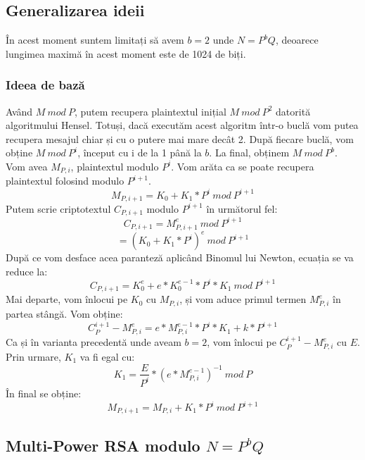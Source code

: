\documentclass[12]{report}
\begin{document}
		  \subsection{Generalizarea ideii}
		  În acest moment suntem limitați să avem $b=2$ unde $N=P^bQ$, deoarece lungimea maximă în acest moment este de 1024 de biți.
		  \subsubsection{Ideea de bază}
		  Având $M \ mod \ P$, putem recupera plaintextul inițial $ M \ mod \ P^2$ datorită algoritmului Hensel. Totuși, dacă executăm acest algoritm într-o buclă vom putea recupera mesajul chiar și cu o putere mai mare decât 2. După fiecare buclă, vom obține $ M  \ mod \ P^i$, început cu i de la 1 până la $b$. La final, obținem $M \ mod \ P^b$. Vom avea $M_{P,i}$, plaintextul modulo $P^i$. Vom arăta ca se poate recupera plaintextul folosind modulo $P^{i+1}.$
		  $$M_{P,i+1} = K_0 +K_1 * P^i \ mod \ P^{i+1}$$
		  Putem scrie criptotextul $C_{P,i+1}$ modulo $P^{i+1}$ în următorul fel:
		  $$C_{P,i+1} = M_{P,i+1}^{e} \ mod \ P^{i+1}$$
		  $$ = (K_0+K_1*P^i)^e \ mod \ P^{i+1} $$
		  După ce vom desface acea paranteză aplicând Binomul lui Newton, ecuația se va reduce la:
		  $$ C_{P,i+1} = K_{0}^{e} + e*K_{0}^{e-1} *P^i*K_1 \ mod \ P^{i+1}$$
		  Mai departe, vom înlocui pe $K_0$ cu $M_{P,i}$, și vom aduce primul termen $M_{P,i}^{e}$ în partea stângă. Vom obține:
		  $$C_{P}^{i+1} - M_{P,i}^{e} = e*M_{P,i}^{e-1} * P^i * K_1 + k *P^{i+1}$$
		  Ca și în varianta precedentă unde aveam $b=2$, vom înlocui pe $C_{P}^{i+1} - M_{P,i}^{e}$ cu $E$. Prin urmare, $K_1$ va fi egal cu:
		  $$K_1 = \frac{E}{P^i} * (e*M_{P,i}^{e-1})^{-1} \ mod \ P$$
		  În final se obține:
		  $$M_{P,i+1}= M_{P,i} + K_1 * P^i \ mod \ P^{i+1}$$
		  \subsection{Multi-Power RSA modulo $N=P^bQ$}
\end{document}
